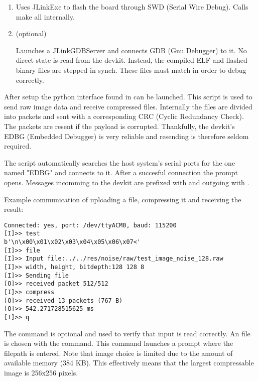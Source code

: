 \documentclass[12pt, a4paper]{article}
\begin{document}
\begin{enumerate}
    \item {}

        \medskip
        \noindent
        Uses JLinkExe to flash the board through SWD (Serial Wire Debug). 
        Calls make all internally.

    \item (optional) 

        \medskip
        \noindent
        Launches a JLinkGDBServer and connects GDB (Gnu Debugger) to it. 
        No direct state is read from the devkit. 
        Instead, the compiled ELF and flashed binary files are stepped in synch. 
        These files must match in order to debug correctly. 
\end{enumerate}

\medskip
\noindent
After setup the python interface found in   can be launched. 
This script is used to send raw image data and receive compressed files. 
Internally the files are divided into packets and sent with a corresponding CRC (Cyclic Redundancy Check).
The packets are resent if the payload is corrupted. 
Thankfully, the devkit's EDBG (Embedded Debugger) is very reliable and resending is therefore seldom required.

\medskip
\noindent
The script automatically searches the host system's serial ports for the one named "EDBG" and connects to it. 
After a succesful connection the prompt opens. 
Messages incomming to the devkit are prefixed with \code{[I]} and outgoing with \code{[O]}.

\medskip
\noindent
Example communication of uploading a file, compressing it and receiving the result:

\bigskip
\begin{minipage}{\textwidth}
\begin{verbatim}
Connected: yes, port: /dev/ttyACM0, baud: 115200
[I]>> test
b'\n\x00\x01\x02\x03\x04\x05\x06\x07<'
[I]>> file
[I]>> Input file:../../res/noise/raw/test_image_noise_128.raw
[I]>> width, height, bitdepth:128 128 8
[I]>> Sending file
[O]>> received packet 512/512
[I]>> compress
[O]>> received 13 packets (767 B)
[O]>> 542.271728515625 ms
[I]>> q
\end{verbatim}
\end{minipage}

\bigskip
\noindent
The  command is optional and used to verify that input is read correctly. 
An file is chosen with the  command. 
This command launches a prompt where the filepath is entered. 
Note that image choice is limited due to the amount of available memory (384 KB). 
This effectively means that the largest compressable image is 256x256 pixels. 
\end{document}
